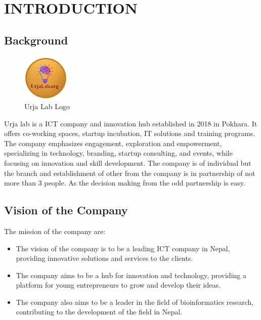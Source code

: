 \setcounter{page}{1}
\chapter{INTRODUCTION}
    \section{Background}
    \begin{figure}[h]
        \centering  
        \includegraphics[width=0.2\textwidth]{Graphics/urjalab.png}
        \caption[Urja Lab Logo]{Urja Lab Logo}
        \label{fig:lablogo}
    \end{figure}
        Urja lab is a ICT company and innovation hub established in 2018 in Pokhara. It offers co-working spaces, startup incubation, IT solutions and training programs. The company emphasizes engagement, exploration and empowerment, specializing in technology, branding, startup consulting, and events, while focusing on innovation and skill development. The company is of individual but the branch and establishment of other from the company is in partnership of not more than 3 people. As the decision making from the odd partnership is easy.

    \section{Vision of the Company} 
    The mission of the company are:
  \begin{itemize}
    \item The vision of the company is to be a leading ICT company in Nepal, providing innovative solutions and services to the clients.
    \item The company aims to be a hub for innovation and technology, providing a platform for young entrepreneurs to grow and develop their ideas.
    \item The company also aims to be a leader in the field of bioinformatics research, contributing to the development of the field in Nepal.

 \end{itemize}  
    
    
    
